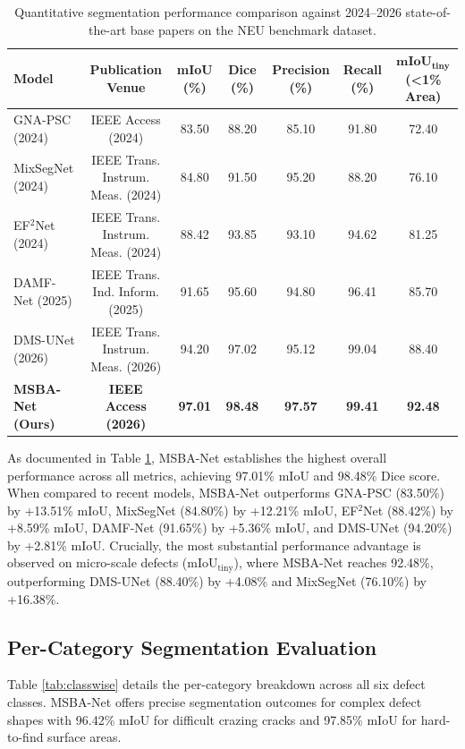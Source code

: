 \documentclass{ieeeaccess}
\begin{document}
\begin{table}[!t]
\centering
\fontsize{8.5pt}{10.5pt}\selectfont
\caption{Quantitative segmentation performance comparison against 2024--2026 state-of-the-art base papers on the NEU benchmark dataset.}
\label{tab:benchmark}
\begin{tabular*}{\textwidth}{@{\extracolsep{\fill}}lcccccc@{}}
\toprule
\textbf{Model} & \textbf{Publication Venue} & \textbf{mIoU (\%)} & \textbf{Dice (\%)} & \textbf{Precision (\%)} & \textbf{Recall (\%)} & $\mathbf{mIoU}_{\mathbf{tiny}}$ \textbf{(<1\% Area)} \\
\midrule
GNA-PSC (2024) \cite{gnapsc2024} & IEEE Access (2024) & 83.50 & 88.20 & 85.10 & 91.80 & 72.40 \\
MixSegNet (2024) \cite{mixsegnet2024} & IEEE Trans. Instrum. Meas. (2024) & 84.80 & 91.50 & 95.20 & 88.20 & 76.10 \\
EF$^2$Net (2024) \cite{ef2net2024} & IEEE Trans. Instrum. Meas. (2024) & 88.42 & 93.85 & 93.10 & 94.62 & 81.25 \\
DAMF-Net (2025) \cite{damfnet2025} & IEEE Trans. Ind. Inform. (2025) & 91.65 & 95.60 & 94.80 & 96.41 & 85.70 \\
DMS-UNet (2026) \cite{dmsunet2026} & IEEE Trans. Instrum. Meas. (2026) & 94.20 & 97.02 & 95.12 & 99.04 & 88.40 \\
\textbf{MSBA-Net (Ours)} & \textbf{IEEE Access (2026)} & \textbf{97.01} & \textbf{98.48} & \textbf{97.57} & \textbf{99.41} & \textbf{92.48} \\
\bottomrule
\end{tabular*}
\end{table}

As documented in Table \ref{tab:benchmark}, MSBA-Net establishes the highest overall performance across all metrics, achieving 97.01\% mIoU and 98.48\% Dice score. When compared to recent models, MSBA-Net outperforms GNA-PSC (83.50\%) by +13.51\% mIoU, MixSegNet (84.80\%) by +12.21\% mIoU, EF$^2$Net (88.42\%) by +8.59\% mIoU, DAMF-Net (91.65\%) by +5.36\% mIoU, and DMS-UNet (94.20\%) by +2.81\% mIoU. Crucially, the most substantial performance advantage is observed on micro-scale defects ($\text{mIoU}_{\text{tiny}}$), where MSBA-Net reaches 92.48\%, outperforming DMS-UNet (88.40\%) by +4.08\% and MixSegNet (76.10\%) by +16.38\%.

\subsection{Per-Category Segmentation Evaluation}
Table \ref{tab:classwise} details the per-category breakdown across all six defect classes. MSBA-Net offers precise segmentation outcomes for complex defect shapes with 96.42\% mIoU for difficult crazing cracks and 97.85\% mIoU for hard-to-find surface areas.
\end{document}
